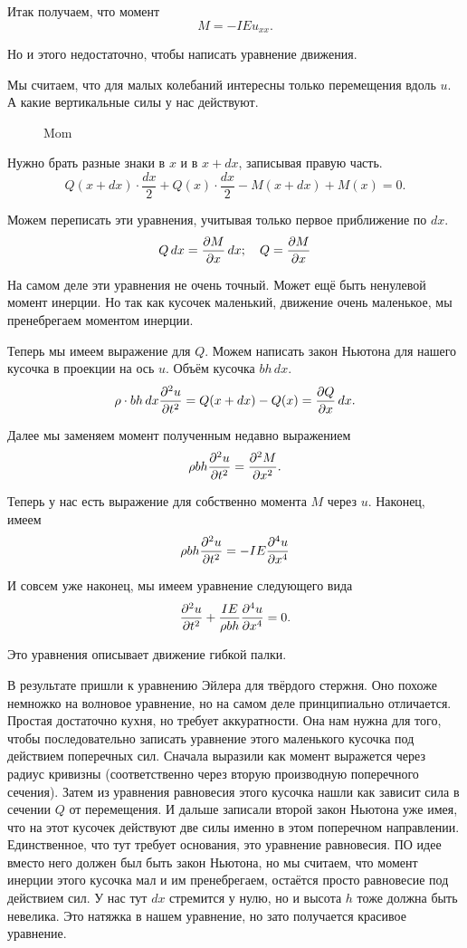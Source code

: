 Итак получаем, что момент
\[
  M = - IE u_{xx}.
\]

Но и этого недостаточно, чтобы написать уравнение движения.

Мы считаем, что для малых колебаний интересны только перемещения вдоль $u$. А какие вертикальные силы у нас действуют.
\begin{figure}[H]
  \centering
  \caption{Mom}
  \label{fig:mom}
\end{figure}

Нужно брать разные знаки в $x$ и в $x + dx$, записывая правую часть.
\[
  Q (x + dx) \cdot \frac{dx}2 + Q(x) \cdot \frac{dx}2 - M(x + dx) + M(x) = 0.
\]

Можем переписать эти уравнения, учитывая только первое приближение по $dx$.
\[
  Q\,dx = \frac{\partial M}{\partial x}\,dx;\quad Q = \frac{\partial M}{\partial x}
\]

На самом деле эти уравнения не очень точный. Может ещё быть ненулевой момент инерции. Но так как кусочек маленький, движение очень маленькое, мы пренебрегаем моментом инерции.

Теперь мы имеем выражение для $Q$. Можем написать закон Ньютона для нашего кусочка в проекции на ось $u$. Объём кусочка $bh\,dx$.
\[
  \rho\cdot b h \,dx\frac{\partial ^2u}{\partial t^2} = Q(x+dx) - Q(x) = \frac{\partial Q}{\partial x}\,dx.
\]

Далее мы заменяем момент полученным недавно выражением
\[
  \rho bh \frac{\partial ^2u}{\partial t^2} = \frac{\partial ^2M}{\partial x^2}.
\]

Теперь у нас есть выражение для собственно момента $M$ через $u$. Наконец, имеем
\[
  \rho b h \frac{\partial ^2u}{\partial t^2} = -IE\frac{\partial ^4u}{\partial x^4}
\]

И совсем уже наконец, мы имеем уравнение следующего вида
\[
  \frac{\partial ^2u}{\partial t^2} + \frac{IE}{\rho b h} \frac{\partial ^4u}{\partial x^4} = 0.
\]

Это уравнения описывает движение гибкой палки.

В результате пришли к уравнению Эйлера для твёрдого стержня. Оно похоже немножко на волновое уравнение, но на самом деле принципиально отличается.
Простая достаточно кухня, но требует аккуратности. Она нам нужна для того, чтобы последовательно записать уравнение этого маленького кусочка под действием поперечных сил.
Сначала выразили как момент выражется через радиус кривизны (соответственно через вторую производную поперечного сечения). Затем из уравнения равновесия этого кусочка нашли как зависит сила в сечении $Q$ от перемещения. И дальше записали второй закон Ньютона уже имея, что на этот кусочек действуют две силы именно в этом поперечном направлении.
Единственное, что тут требует основания, это уравнение равновесия. ПО идее вместо него должен был быть закон Ньютона, но мы считаем, что момент инерции этого кусочка мал и им пренебрегаем, остаётся просто равновесие под действием сил. У нас тут $dx$ стремится у нулю, но и высота $h$ тоже должна быть невелика. Это натяжка в нашем уравнение, но зато получается красивое уравнение.

